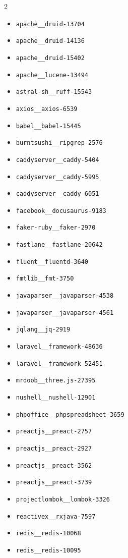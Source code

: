 \begin{multicols}{2}
\begin{itemize}
\item \texttt{apache\_\_druid-13704}
\item \texttt{apache\_\_druid-14136}
\item \texttt{apache\_\_druid-15402}
\item \texttt{apache\_\_lucene-13494}
\item \texttt{astral-sh\_\_ruff-15543}
\item \texttt{axios\_\_axios-6539}
\item \texttt{babel\_\_babel-15445}
\item \texttt{burntsushi\_\_ripgrep-2576}
\item \texttt{caddyserver\_\_caddy-5404}
\item \texttt{caddyserver\_\_caddy-5995}
\item \texttt{caddyserver\_\_caddy-6051}
\item \texttt{facebook\_\_docusaurus-9183}
\item \texttt{faker-ruby\_\_faker-2970}
\item \texttt{fastlane\_\_fastlane-20642}
\item \texttt{fluent\_\_fluentd-3640}
\item \texttt{fmtlib\_\_fmt-3750}
\item \texttt{javaparser\_\_javaparser-4538}
\item \texttt{javaparser\_\_javaparser-4561}
\item \texttt{jqlang\_\_jq-2919}
\item \texttt{laravel\_\_framework-48636}
\item \texttt{laravel\_\_framework-52451}
\item \texttt{mrdoob\_\_three.js-27395}
\item \texttt{nushell\_\_nushell-12901}
\item \texttt{phpoffice\_\_phpspreadsheet-3659}
\item \texttt{preactjs\_\_preact-2757}
\item \texttt{preactjs\_\_preact-2927}
\item \texttt{preactjs\_\_preact-3562}
\item \texttt{preactjs\_\_preact-3739}
\item \texttt{projectlombok\_\_lombok-3326}
\item \texttt{reactivex\_\_rxjava-7597}
\item \texttt{redis\_\_redis-10068}
\item \texttt{redis\_\_redis-10095}

\end{itemize}
\end{multicols}
